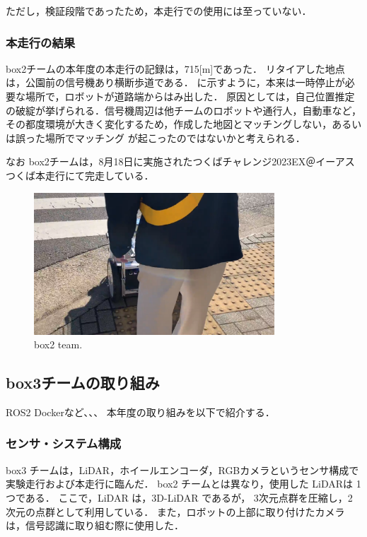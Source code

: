 \documentclass[twocolumn, 9pt]{jsproceedings}
\begin{document}
ただし，検証段階であったため，本走行での使用には至っていない．







\subsubsection{本走行の結果}
box2チームの本年度の本走行の記録は，715[m]であった．
リタイアした地点は，公園前の信号機あり横断歩道である．
に示すように，本来は一時停止が必要な場所で，ロボットが道路端からはみ出した．
原因としては，自己位置推定の破綻が挙げられる．信号機周辺は他チームのロボットや通行人，自動車など，
その都度環境が大きく変化するため，作成した地図とマッチングしない，あるいは誤った場所でマッチング
が起こったのではないかと考えられる．

なお box2チームは，8月18日に実施されたつくばチャレンジ2023EX＠イーアスつくば本走行にて完走している．

\begin{figure}[h!]
  \centering
  \includegraphics[width=90mm]{fig/result_box2_cut.pdf}
  \caption{box2 team.}
  \label{fig:box2-result}
\end{figure}



\subsection{box3チームの取り組み}
ROS2 Dockerなど、、、
本年度の取り組みを以下で紹介する．

\subsubsection{センサ・システム構成}
box3 チームは，LiDAR，ホイールエンコーダ，RGBカメラというセンサ構成で実験走行および本走行に臨んだ．
box2 チームとは異なり，使用した LiDARは 1つである．
ここで，LiDAR は，3D-LiDAR であるが，
3次元点群を圧縮し，2次元の点群として利用している．
また，ロボットの上部に取り付けたカメラは，信号認識に取り組む際に使用した．
\end{document}
